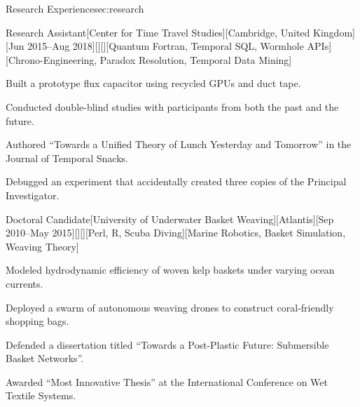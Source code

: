\documentclass[10pt, letterpaper, extended ]{i-am-developer}
\begin{document}
\begin{devCVSection}{Research Experience}{sec:research}
  \begin{devRole}{Research Assistant}[Center for Time Travel
    Studies][Cambridge, United Kingdom][Jun 2015--Aug
    2018][\faClock][\faMapMarker][Quantum Fortran, Temporal SQL,
    Wormhole APIs][Chrono-Engineering, Paradox Resolution, Temporal Data Mining]
    \begin{devItemize}
    \item Built a prototype flux capacitor using recycled GPUs and duct tape.
    \item Conducted double-blind studies with participants from both
      the past and the future.
    \item Authored “Towards a Unified Theory of Lunch Yesterday and
      Tomorrow” in the Journal of Temporal Snacks.
    \item Debugged an experiment that accidentally created three
      copies of the Principal Investigator.
    \end{devItemize}
  \end{devRole}

  \begin{devRole}{Doctoral Candidate}[University of Underwater Basket
    Weaving][Atlantis][Sep 2010--May
    2015][\faGraduationCap][\faMapMarker][Perl, R, Scuba
    Diving][Marine Robotics, Basket Simulation, Weaving Theory]
    \begin{devItemize}
    \item Modeled hydrodynamic efficiency of woven kelp baskets under
      varying ocean currents.
    \item Deployed a swarm of autonomous weaving drones to construct
      coral-friendly shopping bags.
    \item Defended a dissertation titled “Towards a Post-Plastic
      Future: Submersible Basket Networks”.
    \item Awarded “Most Innovative Thesis” at the International
      Conference on Wet Textile Systems.
    \end{devItemize}
  \end{devRole}
\end{devCVSection}
\end{document}

